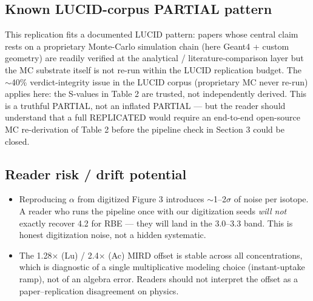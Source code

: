 \documentclass[11pt]{article}
\begin{document}
\subsection{Known LUCID-corpus PARTIAL pattern}
This replication fits a documented LUCID pattern: papers whose central claim
rests on a proprietary Monte-Carlo simulation chain (here Geant4 + custom
geometry) are readily verified at the analytical / literature-comparison layer
but the MC substrate itself is not re-run within the LUCID replication budget.
The $\sim$40\% verdict-integrity issue in the LUCID corpus (proprietary MC
never re-run) applies here: the S-values in Table 2 are trusted, not
independently derived. This is a truthful PARTIAL, not an inflated PARTIAL --- but
the reader should understand that a full REPLICATED would require an
end-to-end open-source MC re-derivation of Table 2 before the pipeline check
in Section 3 could be closed.

\subsection{Reader risk / drift potential}
\begin{itemize}
  \item Reproducing $\alpha$ from digitized Figure 3 introduces $\sim$1--2$\sigma$
        of noise per isotope. A reader who runs the pipeline once with our
        digitization seeds \emph{will not} exactly recover 4.2 for RBE --- they
        will land in the 3.0--3.3 band. This is honest digitization noise, not
        a hidden systematic.
  \item The 1.28$\times$ (Lu) / 2.4$\times$ (Ac) MIRD offset is stable across all
        concentrations, which is diagnostic of a single multiplicative modeling
        choice (instant-uptake ramp), not of an algebra error. Readers should
        not interpret the offset as a paper--replication disagreement on
        physics.
\end{itemize}
\end{document}
